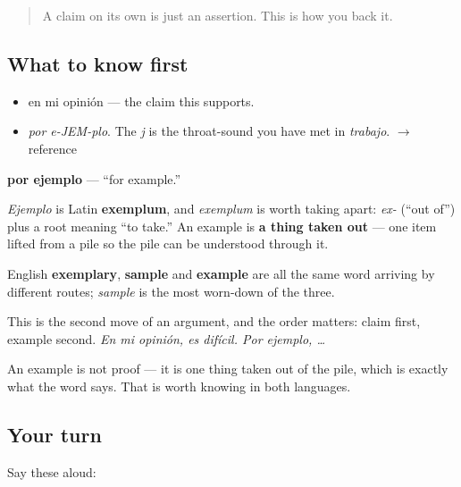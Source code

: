 \label{lesson:ES-C270-por-ejemplo}



\begin{quote}
A claim on its own is just an assertion. This is how you back it.
\end{quote}

\subsection*{What to know first}
\begin{itemize}
\raggedright
  \item en mi opinión — the claim this supports.
\end{itemize}

\begin{sounds}
\begin{itemize}
\raggedright
  \item \emph{por e-JEM-plo}. The \emph{j} is the throat-sound you have met in \emph{trabajo}. $\to$ reference
\end{itemize}
\end{sounds}

\begin{cousinweb}
\textbf{por ejemplo} — \textquotedblleft{}for example.\textquotedblright{}

\emph{Ejemplo} is Latin \textbf{exemplum}, and \emph{exemplum} is worth taking apart: \emph{ex-} (\textquotedblleft{}out of\textquotedblright{}) plus a root meaning \textquotedblleft{}to take.\textquotedblright{} An example is \textbf{a thing taken out} — one item lifted from a pile so the pile can be understood through it.

English \textbf{exemplary}, \textbf{sample} and \textbf{example} are all the same word arriving by different routes; \emph{sample} is the most worn-down of the three.
\end{cousinweb}

\begin{grammarlens}[title={What you've built}]
This is the second move of an argument, and the order matters: claim first, example second. \emph{En mi opinión, es difícil. Por ejemplo, …}

An example is not proof — it is one thing taken out of the pile, which is exactly what the word says. That is worth knowing in both languages.
\end{grammarlens}

\subsection*{Your turn}
Say these aloud:

